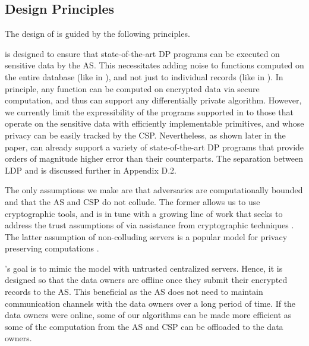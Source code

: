  

\subsection{\system Design Principles}\label{sec:discuss-arch}
The design of \system is guided by the following principles. 

 \system is designed to ensure that state-of-the-art DP programs can be executed on sensitive data by the \textsf{AS}. This necessitates adding noise to functions computed on the entire database (like in \cdp), and not just to individual records (like in \ldp). In principle, any function can be computed on encrypted data via secure computation, and thus \system can support any differentially private algorithm. However, we currently limit the expressibility of the programs supported in \system to those that operate on the sensitive data with efficiently implementable primitives, and whose privacy can be easily tracked by the \textsf{CSP}. Nevertheless, as shown later in the paper, \system can already support a variety of state-of-the-art DP programs that provide orders of magnitude higher error than their \ldp counterparts. The separation between \textsf{LDP} and \system is discussed further in Appendix D.2.

 The only assumptions we make are that adversaries are computationally bounded and that the \textsf{AS} and  \textsf{CSP} do not collude. The former allows us to use cryptographic tools, and is in tune with a growing line of work that seeks to address the trust assumptions of \cdp via assistance from cryptographic techniques \cite{Prochlo,mixnets,amplification,Shi,Shi2,kamara,Rastogi}. The latter assumption of non-colluding servers is a popular model for privacy preserving computations \cite{Boneh1,Boneh2,Ridge2,Matrix2,secureML,LReg,Ver}.

 \system's goal is to mimic the \cdp model with untrusted centralized servers. Hence, it is designed so that the data owners are offline once they submit their encrypted records to the \textsf{AS}. This beneficial as the \textsf{AS} does not need to maintain communication channels with the data owners over a long period of time. If the data owners were online, some of our algorithms can be made more efficient as some of the computation from the \textsf{AS} and \textsf{CSP} can be offloaded to the data owners.

